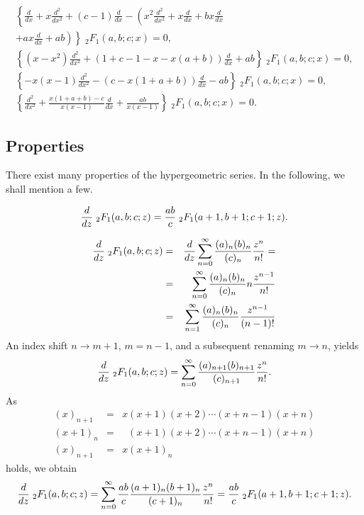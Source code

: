 {\begin{equation}
\begin{split}
\left\{ \frac{d}{dx} + x \frac{d^2}{dx^2} +(c-1)\frac{d}{dx}
 -    \left(x^2 \frac{d^2}{dx^2}+ x \frac{d}{dx}+ bx\frac{d}{dx}
\right.
\right.
  \qquad  \\
\left.
\left.
+  ax \frac{d}{dx} +ab\right) \right\}  {\;}_2F_1(a,b;c;x) =0,
   \\
\left\{  \left( x    -x^2 \right)\frac{d^2}{dx^2}
+
\left(
1+c-1-x-x(a+b)
\right)\frac{d}{dx}
+
ab  \right\}  {\;}_2F_1(a,b;c;x) =0
,   \\
\left\{ -   x(x-1)\frac{d^2}{dx^2}
-
\left(
c-x(1+a+b)
\right)\frac{d}{dx}
-
ab \right\}  {\;}_2F_1(a,b;c;x) =0,
   \\
\left\{ \frac{d^2}{dx^2}
+
\frac{x(1+a+b)-c}{x(x-1)}
\frac{d}{dx}
+
\frac{ab}{x(x-1)} \right\}  {\;}_2F_1(a,b;c;x) =0.
\end{split}
\label{2011-m-ch-sfhserddovd1234}
\end{equation}


\eproof
}

\subsection{Properties}

There exist many properties of the hypergeometric series.
In the following, we shall mention a few.


\begin{equation}
{d\over dz}{\;}_2F_1(a,b;c;z)={ab\over c}{\;}_2F_1(a+1,b+1;c+1;z) .
\end{equation}

{\color{OliveGreen}
\bproof

\begin{eqnarray*}
   {d\over dz}{\;}_2F_1(a,b;c;z)&=&{d\over dz}\sum_{n=0}^\infty
                           {(a)_n(b)_n\over(c)_n}{z^n\over n!}=\\
                        &=&\sum_{n=0}^\infty {(a)_n(b)_n\over(c)_n}
                           n{z^{n-1}\over n!}\\
                         &=&\sum_{n=1}^\infty
                           {(a)_n(b)_n\over(c)_n}{z^{n-1}\over(n-1)!}
\end{eqnarray*}
An index shift $n\to m+1$, $m=n-1$, and a subsequent renaming $m \to n$, yields
$$
   {d\over dz}{\;}_2F_1(a,b;c;z)=\sum_{n=0}^\infty
   {(a)_{n+1}(b)_{n+1}\over(c)_{n+1}}{z^n\over n!} .
$$
As
\begin{eqnarray*}
   (x)_{n+1}&=&x(x+1)(x+2)\cdots(x+n-1)(x+n)\\
   (x+1)_n  &=&\phantom{x}(x+1)(x+2)\cdots(x+n-1)(x+n)\\
   (x)_{n+1}&=&x(x+1)_n
\end{eqnarray*}
holds, we obtain
$$
   {d\over dz}{\;}_2F_1(a,b;c;z)=\sum_{n=0}^\infty{ab\over c}
   {(a+1)_n(b+1)_n\over(c+1)_n}{z^n\over n!}=
   {ab\over c}{\;}_2F_1(a+1,b+1;c+1;z).
$$

\eproof
}

